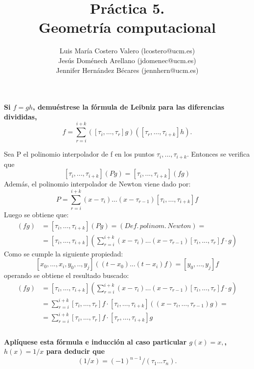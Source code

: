\documentclass[12pt,a4paper]{article}
\title{Práctica 5. \\ Geometría computacional}
\author{Luis María Costero Valero (lcostero@ucm.es)\\ Jesús Doménech
  Arellano (jdomenec@ucm.es) \\ Jennifer Hernández Bécares (jennhern@ucm.es)}
\date{}
\begin{document}
\maketitle
\onehalfspace

\textbf{Si $f=gh$, demuéstrese la fórmula de Leibniz para las diferencias divididas,}
\begin{equation*}
  [\tau_i,\dots,\tau_{i+k}]f=\sum\limits_{r=i}^{i+k}([\tau_i,\dots,\tau_r]g)([\tau_r,\dots,\tau_{i+k}]h).
\end{equation*}

Sea P el polinomio interpolador de f en los puntos $\tau_i, ... ,
\tau_{i+k}$. Entonces se verifica que $$[\tau_{i}, ..., \tau_{i+k}](Pg) =
[\tau_i, ..., \tau_{i+k}](fg)$$
Además, el polinomio interpolador de Newton viene dado por:
$$ P = \sum\limits^{i+k}_{r=i}(x-\tau_i)\dots(x-\tau_{r-1})[\tau_i,\dots,\tau_{i+k}]f$$
Luego se obtiene que:
\begin{align*}
  [\tau_i,\dots,\tau_{i+k}](fg) &= [\tau_i,\dots,\tau_{i+k}](Pg) = (Def.\,polinom.\,Newton)=\\
                      &= [\tau_i,\dots,\tau_{i+k}]\left(\sum\limits_{r=i}^{i+k}(x-\tau_i)...(x-\tau_{r-1})[\tau_i,...,\tau_r]f
                        \cdot g\right)
\end{align*}
Como se cumple la siguiente propiedad:
$$[x_0, ..., x_i, y_0, .., y_j]((t-x_0)...(t-x_i)f) = [y_0,...,y_j]f$$
operando se obtiene el resultado buscado:
\begin{align*}
  [\tau_i,\dots,\tau_{i+k}](fg) &= [\tau_i,\dots,\tau_{i+k}]\left(\sum\limits_{r=i}^{i+k}(x-\tau_i)...(x-\tau_{r-1})[\tau_i,...,\tau_r]f
                        \cdot g\right)\\
                      &=\sum\limits^{i+k}_{r=i}[\tau_i,\dots,\tau_{r}]f \cdot
                        [\tau_i,\dots,\tau_{i+k}]\left((x-\tau_i,\dots,\tau_{r-1})g\right)=\\
                      &=\sum\limits^{i+k}_{r=i}[\tau_i,\dots,\tau_r]f \cdot [\tau_r,
                        \dots, \tau_{i+k}]g\\
\end{align*}\\

\textbf{Aplíquese esta fórmula e inducción al caso particular $g(x)=x,$, $h(x)=1/x$ para deducir que}
\begin{equation*}
  [\tau_1,...,\tau_n](1/x)=(-1)^{n-1}/(\tau_1...\tau_n).
\end{equation*}
\end{document}
